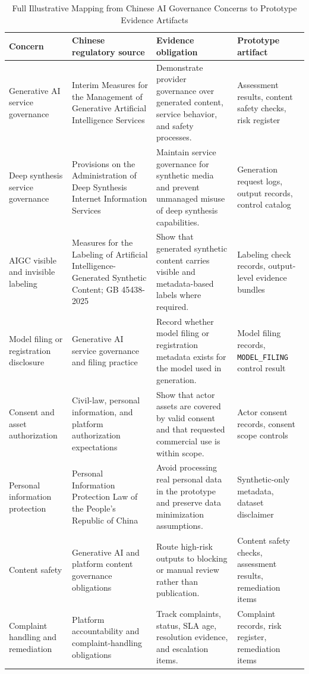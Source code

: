 \begin{table}[!t]
\centering
\caption{Full Illustrative Mapping from Chinese AI Governance Concerns to Prototype Evidence Artifacts}
\label{tab:regulatory-mapping-full}
\scriptsize
\begin{tabularx}{\textwidth}{@{}p{} p{} X p{}@{}}
\toprule
Concern & Chinese regulatory source & Evidence obligation & Prototype artifact \\
\midrule
Generative AI service governance & Interim Measures for the Management of Generative Artificial Intelligence Services & Demonstrate provider governance over generated content, service behavior, and safety processes. & Assessment results, content safety checks, risk register \\
Deep synthesis service governance & Provisions on the Administration of Deep Synthesis Internet Information Services & Maintain service governance for synthetic media and prevent unmanaged misuse of deep synthesis capabilities. & Generation request logs, output records, control catalog \\
AIGC visible and invisible labeling & Measures for the Labeling of Artificial Intelligence-Generated Synthetic Content; GB 45438-2025 & Show that generated synthetic content carries visible and metadata-based labels where required. & Labeling check records, output-level evidence bundles \\
Model filing or registration disclosure & Generative AI service governance and filing practice & Record whether model filing or registration metadata exists for the model used in generation. & Model filing records, \texttt{MODEL\_FILING} control result \\
Consent and asset authorization & Civil-law, personal information, and platform authorization expectations & Show that actor assets are covered by valid consent and that requested commercial use is within scope. & Actor consent records, consent scope controls \\
Personal information protection & Personal Information Protection Law of the People's Republic of China & Avoid processing real personal data in the prototype and preserve data minimization assumptions. & Synthetic-only metadata, dataset disclaimer \\
Content safety & Generative AI and platform content governance obligations & Route high-risk outputs to blocking or manual review rather than publication. & Content safety checks, assessment results, remediation items \\
Complaint handling and remediation & Platform accountability and complaint-handling obligations & Track complaints, status, SLA age, resolution evidence, and escalation items. & Complaint records, risk register, remediation items \\
\bottomrule
\end{tabularx}
\end{table}
